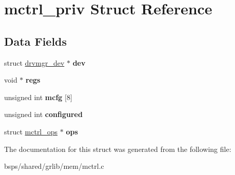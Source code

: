\hypertarget{structmctrl__priv}{}\section{mctrl\+\_\+priv Struct Reference}
\label{structmctrl__priv}
\subsection*{Data Fields}
\begin{DoxyCompactItemize}
\item 
\mbox{\label{structmctrl__priv_abf85a7490a12b8fcd4988e66110ba533}} 
struct \mbox{\hyperlink{structdrvmgr__dev}{drvmgr\+\_\+dev}} $\ast$ {\bfseries dev}
\item 
\mbox{\label{structmctrl__priv_a5c37fce161fc70d5d2877e507079bb7c}} 
void $\ast$ {\bfseries regs}
\item 
\mbox{\label{structmctrl__priv_a7915ed6ce613c5111e61bc72b1ba950f}} 
unsigned int {\bfseries mcfg} \mbox{[}8\mbox{]}
\item 
\mbox{\label{structmctrl__priv_ade4d92a09d8c41712d580a17a3862c5d}} 
unsigned int {\bfseries configured}
\item 
\mbox{\label{structmctrl__priv_a16b8f99adfd1f70b6ab69d588168c220}} 
struct \mbox{\hyperlink{structmctrl__ops}{mctrl\+\_\+ops}} $\ast$ {\bfseries ops}
\end{DoxyCompactItemize}


The documentation for this struct was generated from the following file\+:\begin{DoxyCompactItemize}
\item 
bsps/shared/grlib/mem/mctrl.\+c\end{DoxyCompactItemize}
